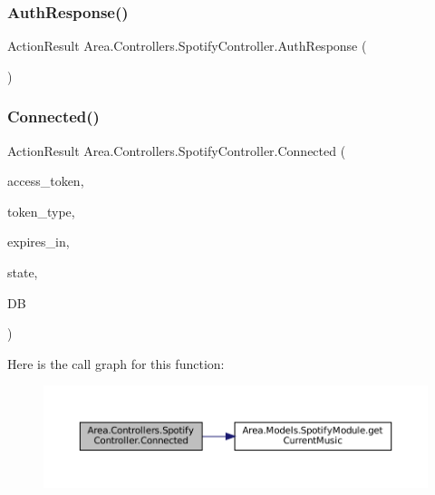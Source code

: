 \subsubsection{\texorpdfstring{Auth\+Response()}{AuthResponse()}}
{\footnotesize\ttfamily Action\+Result Area.\+Controllers.\+Spotify\+Controller.\+Auth\+Response (\begin{DoxyParamCaption}{ }\end{DoxyParamCaption})\hspace{0.3cm}{\ttfamily [inline]}}

\mbox{\label{classArea_1_1Controllers_1_1SpotifyController_a168ce6acbbe7e20e27742781a39bce95}} 
\subsubsection{\texorpdfstring{Connected()}{Connected()}}
{\footnotesize\ttfamily Action\+Result Area.\+Controllers.\+Spotify\+Controller.\+Connected (\begin{DoxyParamCaption}\item[{string}]{access\+\_\+token,  }\item[{string}]{token\+\_\+type,  }\item[{string}]{expires\+\_\+in,  }\item[{string}]{state,  }\item[{\mbox{[}\+From\+Services\mbox{]} \mbox{\hyperlink{classArea_1_1DAT_1_1AreaDbContext}{Area\+Db\+Context}}}]{DB }\end{DoxyParamCaption})\hspace{0.3cm}{\ttfamily [inline]}}

Here is the call graph for this function\+:
\nopagebreak
\begin{figure}[H]
\begin{center}
\leavevmode
\includegraphics[width=350pt]{classArea_1_1Controllers_1_1SpotifyController_a168ce6acbbe7e20e27742781a39bce95_cgraph}
\end{center}
\end{figure}
\mbox{\label{classArea_1_1Controllers_1_1SpotifyController_a7d88f1761fc5ea275a0ccce707e81289}} 

